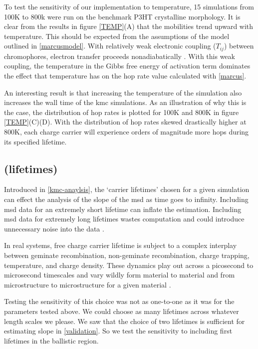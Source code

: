 To test the sensitivity of our implementation to
temperature, 15  simulations from 100K to 800k were run on the benchmark P3HT crystalline morphology. It is clear from the results in figure \ref{TEMP}(A) that the mobilities trend upward with temperature.
This should be expected from the assumptions of the model outlined in \autoref{marcusmodel}. 
With relatively weak electronic coupling ($T_{ij}$) between chromophores, electron transfer proceeds nonadiabatically \cite{clarke2010}. With this weak coupling, the temperature in the Gibbs free energy of activation term
dominates the effect that temperature has on the hop rate value calculated with \autoref{marcus}.

An interesting result is that increasing the temperature of the 
simulation also increases the wall time of the \gls{kmc} simulations.
As an illustration of why this is the case, the distribution of hop
rates is plotted for 100K and 800K in figure \ref{TEMP}(C)(D). With the distribution of hop rates skewed
drastically higher at 800K, each charge carrier will experience orders of
magnitude more hops during its specified lifetime. 

\subsection{ (lifetimes)}

Introduced in \autoref{kmc-anaylsis}, the `carrier lifetimes' chosen for a given
simulation can effect the analysis of the slope of the \gls{msd} as time goes
to infinity. 
Including \gls{msd} data for an extremely short lifetime can inflate
the estimation. Including \gls{msd} data for extremely long lifetimes wastes computation and could introduce unnecessary noise into the data \cite{Maginn2018}. 

In real systems, free charge
carrier lifetime is subject to a complex interplay between geminate recombination, non-geminate recombination,
charge trapping, temperature, and charge density. These dynamics play out across a picosecond to microsecond
timescales and vary wildly form material to material and from microstructure to microstructure for a
given material \cite{Laquai2015}.

Testing the sensitivity of this choice was not as one-to-one as it was for the
parameters tested above. We could choose as many lifetimes across whatever
length scales we please. We saw that the choice of two lifetimes is sufficient
for estimating slope in \autoref{validation}. So we test the sensitivity to
including first lifetimes in the ballistic region. 

